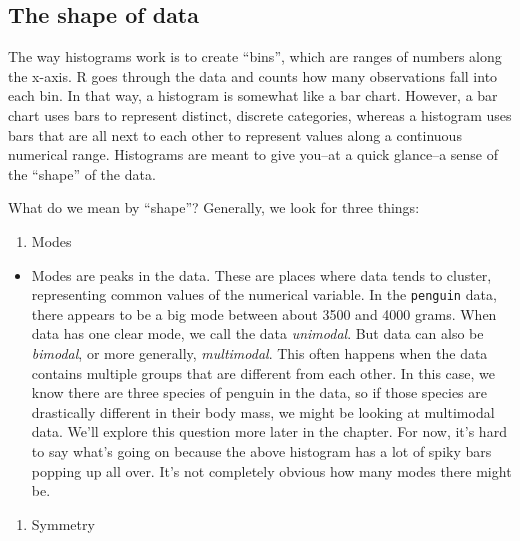 \documentclass[
]{book}
\providecommand{\tightlist}{%
  \setlength{\itemsep}{0pt}\setlength{\parskip}{0pt}}
\begin{document}
\hypertarget{numerical-shape}{%
\subsection{The shape of data}\label{numerical-shape}}

The way histograms work is to create ``bins'', which are ranges of numbers along the x-axis. R goes through the data and counts how many observations fall into each bin. In that way, a histogram is somewhat like a bar chart. However, a bar chart uses bars to represent distinct, discrete categories, whereas a histogram uses bars that are all next to each other to represent values along a continuous numerical range. Histograms are meant to give you--at a quick glance--a sense of the ``shape'' of the data.

What do we mean by ``shape''? Generally, we look for three things:

\begin{enumerate}
\def\labelenumi{\arabic{enumi}.}
\tightlist
\item
  Modes
\end{enumerate}

\begin{itemize}
\tightlist
\item
  Modes are peaks in the data. These are places where data tends to cluster, representing common values of the numerical variable. In the \texttt{penguin} data, there appears to be a big mode between about 3500 and 4000 grams. When data has one clear mode, we call the data \emph{unimodal}. But data can also be \emph{bimodal}, or more generally, \emph{multimodal}. This often happens when the data contains multiple groups that are different from each other. In this case, we know there are three species of penguin in the data, so if those species are drastically different in their body mass, we might be looking at multimodal data. We'll explore this question more later in the chapter. For now, it's hard to say what's going on because the above histogram has a lot of spiky bars popping up all over. It's not completely obvious how many modes there might be.
\end{itemize}

\begin{enumerate}
\def\labelenumi{\arabic{enumi}.}
\setcounter{enumi}{1}
\tightlist
\item
  Symmetry
\end{enumerate}
\end{document}
